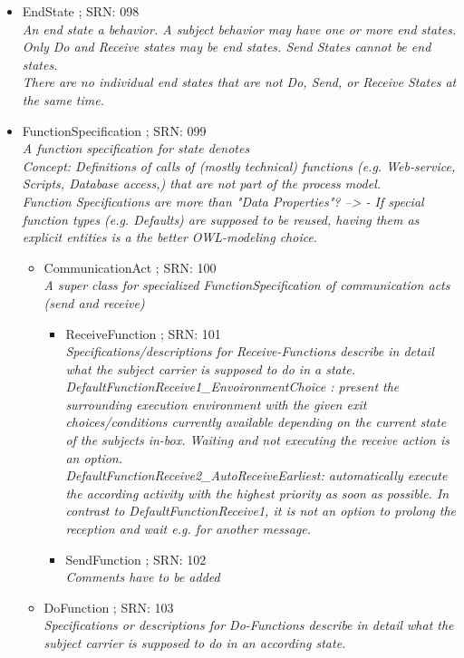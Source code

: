 \begin{itemize}
\begin{itemize}
	\item EndState ; SRN: 098 \\ \textit{An end state a behavior. A subject behavior may have one or more end states. Only Do and Receive states may be end states. Send States cannot be end states.\\
	There are no individual end states that are not Do, Send, or Receive States at the same time.}
	\item FunctionSpecification ; SRN: 099 \\ \textit{A function specification for state denotes\\
	Concept: Definitions of calls of (mostly technical) functions (e.g. Web-service, Scripts, Database access,) that are not part of the process model.\\
	Function Specifications are more than "Data Properties"? --> - If special function types (e.g. Defaults) are supposed to be reused, having them as explicit entities is a the better OWL-modeling choice.}
	\begin{itemize}
		\item CommunicationAct ; SRN: 100 \\ \textit{A super class for specialized FunctionSpecification of communication acts (send and receive)}
		\begin{itemize}
			\item ReceiveFunction ; SRN: 101 \\ \textit{Specifications/descriptions for Receive-Functions describe in detail what the subject carrier is supposed to do in a state.\\
			DefaultFunctionReceive1\_EnvoironmentChoice : present the surrounding execution environment with the given exit choices/conditions currently available depending on the current state of the subjects in-box. Waiting and not executing the receive action is an option.\\
			DefaultFunctionReceive2\_AutoReceiveEarliest: automatically execute the according activity with the highest priority as soon as possible. In contrast to DefaultFunctionReceive1, it is not an option to prolong the reception and wait e.g. for another message.}
			\item SendFunction ; SRN: 102 \\ \textit{Comments have to be added}
		\end{itemize}
		\item DoFunction ; SRN: 103 \\ \textit{Specifications or descriptions for Do-Functions describe in detail what the subject carrier is supposed to do in an according state.\\
}
\end{itemize}
\end{itemize}
\end{itemize}
